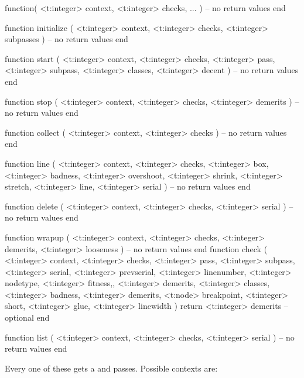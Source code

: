 \starttyping[option=LUA]
function(
    <t:integer> context,
    <t:integer> checks,
    ...
)
    -- no return values
end
\stoptyping

\starttyping[option=LUA]
function initialize (
    <t:integer> context,
    <t:integer> checks,
    <t:integer> subpasses
)
    -- no return values
end
\stoptyping

\starttyping[option=LUA]
function start (
    <t:integer> context,
    <t:integer> checks,
    <t:integer> pass,
    <t:integer> subpass,
    <t:integer> classes,
    <t:integer> decent
)
    -- no return values
end
\stoptyping

\starttyping[option=LUA]
function stop (
    <t:integer> context,
    <t:integer> checks,
    <t:integer> demerits
)
    -- no return values
end
\stoptyping

\starttyping[option=LUA]
function collect (
    <t:integer> context,
    <t:integer> checks
)
    -- no return values
end
\stoptyping

\starttyping[option=LUA]
function line (
    <t:integer> context,
    <t:integer> checks,
    <t:integer> box,
    <t:integer> badness,
    <t:integer> overshoot,
    <t:integer> shrink,
    <t:integer> stretch,
    <t:integer> line,
    <t:integer> serial
)
    -- no return values
end
\stoptyping

\starttyping[option=LUA]
function delete (
    <t:integer> context,
    <t:integer> checks,
    <t:integer> serial
)
    -- no return values
end
\stoptyping

\starttyping[option=LUA]
function wrapup (
    <t:integer> context,
    <t:integer> checks,
    <t:integer> demerits,
    <t:integer> looseness
)
    -- no return values
end
\stoptyping
\starttyping[option=LUA]
function check (
    <t:integer> context,
    <t:integer> checks,
    <t:integer> pass,
    <t:integer> subpass,
    <t:integer> serial,
    <t:integer> prevserial,
    <t:integer> linenumber,
    <t:integer> nodetype,
    <t:integer> fitness,,
    <t:integer> demerits,
    <t:integer> classes,
    <t:integer> badness,
    <t:integer> demerits,
    <t:node>    breakpoint,
    <t:integer> short,
    <t:integer> glue,
    <t:integer> linewidth
)
    return <t:integer> demerits  -- optional
end
\stoptyping

\starttyping[option=LUA]
function list (
    <t:integer> context,
    <t:integer> checks,
    <t:integer> serial
)
    -- no return values
end
\stoptyping

Every one of these gets a  and  passes. Possible
contexts are:

